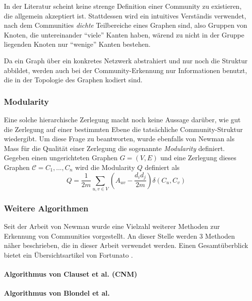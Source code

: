 In der Literatur scheint keine strenge Definition einer Community zu
existieren, die allgemein akzeptiert ist. Stattdessen wird ein
intuitives Verst\"andis verwendet, nach dem Communities \emph{dichte}
Teilbereiche eines Graphen sind, also Gruppen von Knoten, die
untereinander ``viele'' Kanten haben, w\"arend zu nicht in der Gruppe
liegenden Knoten nur ``wenige'' Kanten bestehen.

Da ein Graph \"uber ein konkretes Netzwerk abstrahiert und nur noch
die Struktur abbildet, werden auch bei der Community-Erkennung nur
Informationen benutzt, die in der Topologie des Graphen kodiert sind. 

\cite{Girvan2002}

\subsubsection{Modularity}
\label{sec:modularity}

Eine solche hierarchische Zerlegung macht noch keine Aussage
dar\"uber, wie gut die Zerlegung auf einer bestimmten Ebene die
tats\"achliche Community-Struktur wiedergibt. Um diese Frage zu
beantworten, wurde ebenfalls von Newman als Mass f\"ur die Qualit\"at
einer Zerlegung die sogenannte \emph{Modularity} definiert. Gegeben
einen ungerichteten Graphen $G=(V, E)$ und eine Zerlegung dieses
Graphen $\mathcal{C} = C_1, ..., C_n$ wird die Modularity $Q$
definiert als
\begin{equation}
  \label{eq:modularity}
  Q =
  \frac{1}{2m}\sum_{u, v \in V}\left(A_{uv}-\frac{d_id_j}{2m}\right)\delta(C_u, C_v)
\end{equation}

\subsubsection{Weitere Algorithmen}
\label{sec:algorithmen}

Seit der Arbeit von Newman wurde eine Vielzahl weiterer Methoden zur
Erkennung von Communities vorgestellt. An dieser Stelle werden 3
Methoden n\"aher beschrieben, die in dieser Arbeit verwendet
werden. Einen Gesamt\"uberblick bietet ein \"Ubersichtsartikel von
Fortunato \cite{Fortunato2010}.

\paragraph{Algorithmus von Clauset et al.  (CNM)}
\label{sec:algor-von-girv}

\paragraph{Algorithmus von Blondel et al.}
\label{sec:algor-von-blond}

